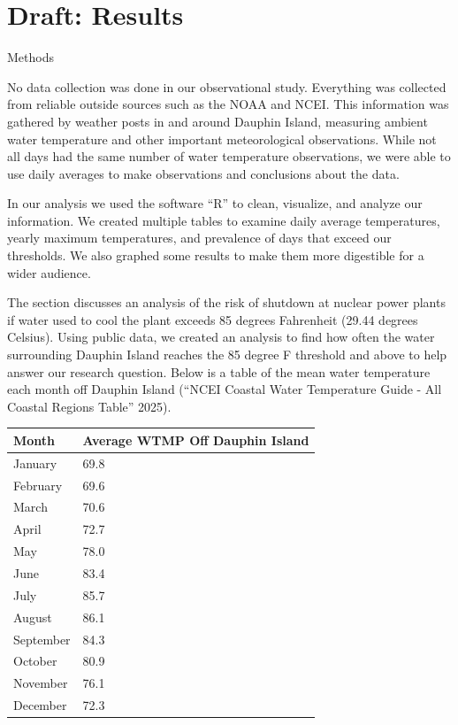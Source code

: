 \documentclass[
  letterpaper,
  DIV=11,
  numbers=noendperiod]{scrreprt}
\begin{document}
\chapter{Draft: Results}\label{draft-results}

Methods

No data collection was done in our observational study. Everything was
collected from reliable outside sources such as the NOAA and NCEI. This
information was gathered by weather posts in and around Dauphin Island,
measuring ambient water temperature and other important meteorological
observations. While not all days had the same number of water
temperature observations, we were able to use daily averages to make
observations and conclusions about the data.

In our analysis we used the software ``R'' to clean, visualize, and
analyze our information. We created multiple tables to examine daily
average temperatures, yearly maximum temperatures, and prevalence of
days that exceed our thresholds. We also graphed some results to make
them more digestible for a wider audience.

The section discusses an analysis of the risk of shutdown at nuclear
power plants if water used to cool the plant exceeds 85 degrees
Fahrenheit (29.44 degrees Celsius). Using public data, we created an
analysis to find how often the water surrounding Dauphin Island reaches
the 85 degree F threshold and above to help answer our research
question. Below is a table of the mean water temperature each month off
Dauphin Island ({``NCEI Coastal Water Temperature Guide - All Coastal
Regions Table''} 2025).

\begin{longtable}[]{@{}ll@{}}
\toprule\noalign{}
Month & Average WTMP Off Dauphin Island \\
\midrule\noalign{}
\endhead
\bottomrule\noalign{}
\endlastfoot
January & 69.8 \\
February & 69.6 \\
March & 70.6 \\
April & 72.7 \\
May & 78.0 \\
June & 83.4 \\
July & 85.7 \\
August & 86.1 \\
September & 84.3 \\
October & 80.9 \\
November & 76.1 \\
December & 72.3 \\
\end{longtable}
\end{document}
